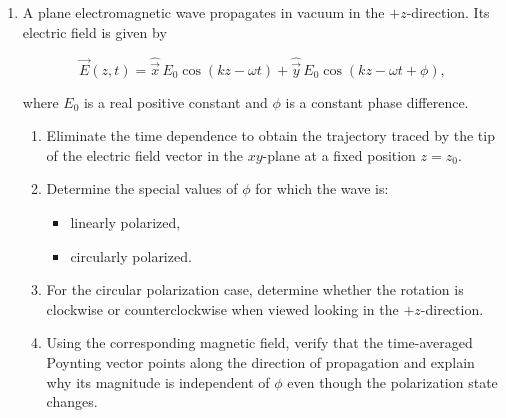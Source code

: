 \documentclass[12pt]{article}
\begin{document}
\begin{enumerate}
\begin{enumerate}
    \item Show that electromagnetic energy flows into the capacitor from the sides rather than along the wire axis.

    \item Calculate the total rate of energy flow into the volume between the plates by integrating the Poynting vector over the cylindrical side surface.

    \item Show that this equals the rate of increase of electrostatic energy stored in the capacitor:
    \[
    U
    =
    \frac{1}{2}\varepsilon_0 E^2(\pi R^2 d).
    \]

    \item Explain conceptually why this example is important for understanding displacement current and the physical meaning of the Poynting vector.

\end{enumerate}

\item A plane electromagnetic wave propagates in vacuum in the \(+z\)-direction. Its electric field is given by

\[
\vec{E}(z,t)
=
\hat{\vec{x}}\,E_0 \cos(kz-\omega t)
+
\hat{\vec{y}}\,E_0 \cos\!\left(kz-\omega t+\phi\right),
\]

where \(E_0\) is a real positive constant and \(\phi\) is a constant phase difference.

\begin{enumerate}
    \item Eliminate the time dependence to obtain the trajectory traced by the tip of the electric field vector in the \(xy\)-plane at a fixed position \(z=z_0\).

    \item Determine the special values of \(\phi\) for which the wave is:
    \begin{itemize}
        \item linearly polarized,
        \item circularly polarized.
    \end{itemize}

    \item For the circular polarization case, determine whether the rotation is clockwise or counterclockwise when viewed looking in the \(+z\)-direction.

    \item Using the corresponding magnetic field, verify that the time-averaged Poynting vector points along the direction of propagation and explain why its magnitude is independent of \(\phi\) even though the polarization state changes.
\end{enumerate}


\end{enumerate}
\end{document}
